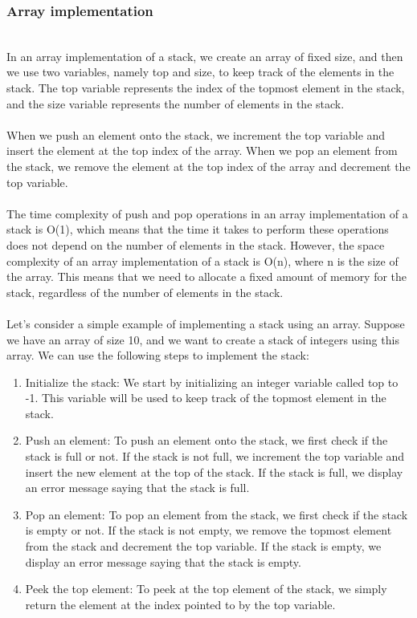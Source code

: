 \documentclass[a4paper, 11pt, oneside]{book} %
\begin{document}
\subsubsection{Array implementation}  
                \\
   In an array implementation of a stack, we create an array of fixed size, and then we use two variables, namely top and size, to keep track of the elements in the stack. The top variable represents the index of the topmost element in the stack, and the size variable represents the number of elements in the stack.
                \\
                \\
   When we push an element onto the stack, we increment the top variable and insert the element at the top index of the array. When we pop an element from the stack, we remove the element at the top index of the array and decrement the top variable.
                \\
                \\
     The time complexity of push and pop operations in an array implementation of a stack is O(1), which means that the time it takes to perform these operations does not depend on the number of elements in the stack. However, the space complexity of an array implementation of a stack is O(n), where n is the size of the array. This means that we need to allocate a fixed amount of memory for the stack, regardless of the number of elements in the stack.
                \\
                \\
    Let's consider a simple example of implementing a stack using an array. Suppose we have an array of size 10, and we want to create a stack of integers using this array. We can use the following steps to implement the stack:
                
                
  \begin{enumerate}
       \item Initialize the stack: We start by initializing an integer variable called top to -1. This variable will be used to keep track of the topmost element in the stack.
                    
        \item Push an element: To push an element onto the stack, we first check if the stack is full or not. If the stack is not full, we increment the top variable and insert the new element at the top of the stack. If the stack is full, we display an error message saying that the stack is full.
                    
       \item Pop an element: To pop an element from the stack, we first check if the stack is empty or not. If the stack is not empty, we remove the topmost element from the stack and decrement the top variable. If the stack is empty, we display an error message saying that the stack is empty.
                    
        \item Peek the top element: To peek at the top element of the stack, we simply return the element at the index pointed to by the top variable.
\end{enumerate}
\end{document}

